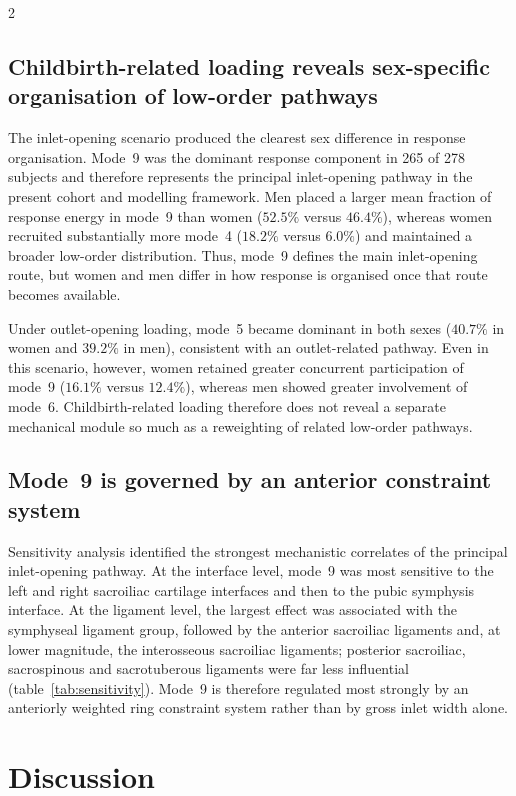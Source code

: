 \documentclass[openacc]{rsproca_new}
\begin{document}
\begin{multicols}{2}
\subsection{Childbirth-related loading reveals sex-specific organisation of low-order pathways}

The inlet-opening scenario produced the clearest sex difference in response organisation. Mode~9 was the dominant response component in 265 of 278 subjects and therefore represents the principal inlet-opening pathway in the present cohort and modelling framework. Men placed a larger mean fraction of response energy in mode~9 than women ($52.5\%$ versus $46.4\%$), whereas women recruited substantially more mode~4 ($18.2\%$ versus $6.0\%$) and maintained a broader low-order distribution. Thus, mode~9 defines the main inlet-opening route, but women and men differ in how response is organised once that route becomes available.

Under outlet-opening loading, mode~5 became dominant in both sexes ($40.7\%$ in women and $39.2\%$ in men), consistent with an outlet-related pathway. Even in this scenario, however, women retained greater concurrent participation of mode~9 ($16.1\%$ versus $12.4\%$), whereas men showed greater involvement of mode~6. Childbirth-related loading therefore does not reveal a separate mechanical module so much as a reweighting of related low-order pathways.

\subsection{Mode~9 is governed by an anterior constraint system}

Sensitivity analysis identified the strongest mechanistic correlates of the principal inlet-opening pathway. At the interface level, mode~9 was most sensitive to the left and right sacroiliac cartilage interfaces and then to the pubic symphysis interface. At the ligament level, the largest effect was associated with the symphyseal ligament group, followed by the anterior sacroiliac ligaments and, at lower magnitude, the interosseous sacroiliac ligaments; posterior sacroiliac, sacrospinous and sacrotuberous ligaments were far less influential (table~\ref{tab:sensitivity}). Mode~9 is therefore regulated most strongly by an anteriorly weighted ring constraint system rather than by gross inlet width alone.

\section{Discussion}


\end{multicols}
\end{document}
